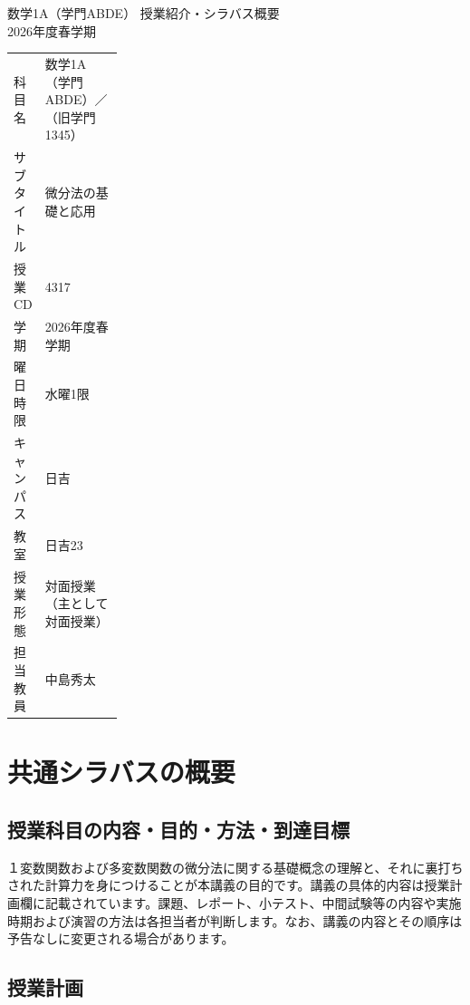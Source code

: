 \documentclass[a4paper,12pt]{jsarticle}
\begin{document}
\begin{center}
{\LARGE 数学1A（学門ABDE） 授業紹介・シラバス概要}\\[0.4em]
2026年度春学期
\end{center}

\begin{tabularx}{\linewidth}{@{}>{\raggedright\arraybackslash}p{0.24\linewidth}X@{}}
\toprule
科目名 & 数学1A（学門ABDE）／（旧学門1345） \\
サブタイトル & 微分法の基礎と応用 \\
授業CD & 4317 \\
学期 & 2026年度春学期 \\
曜日時限 & 水曜1限 \\
キャンパス & 日吉 \\
教室 & 日吉23 \\
授業形態 & 対面授業（主として対面授業） \\
担当教員 & 中島秀太 \\
\bottomrule
\end{tabularx}

\section*{共通シラバスの概要}

\subsection*{授業科目の内容・目的・方法・到達目標}

１変数関数および多変数関数の微分法に関する基礎概念の理解と、それに裏打ちされた計算力を身につけることが本講義の目的です。講義の具体的内容は授業計画欄に記載されています。課題、レポート、小テスト、中間試験等の内容や実施時期および演習の方法は各担当者が判断します。なお、講義の内容とその順序は予告なしに変更される場合があります。

\subsection*{授業計画}
\end{document}
